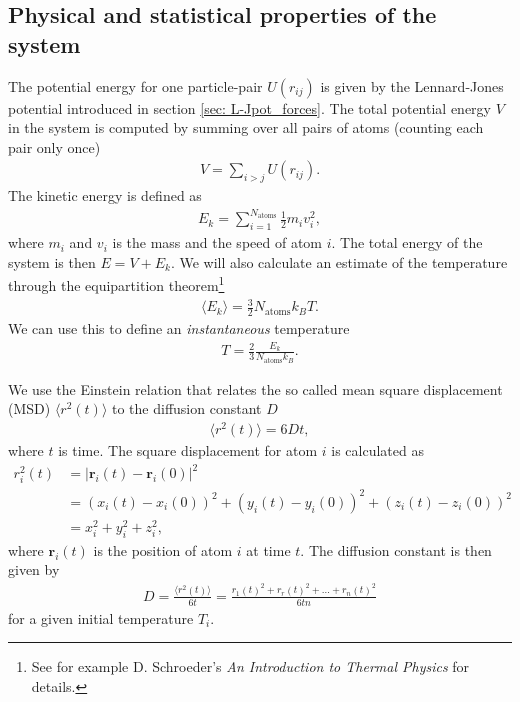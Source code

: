 \documentclass[11pt,a4wide]{article}
\renewcommand{\vec}{\mathbf}
\begin{document}
\subsection{Physical and statistical properties of the system} \label{sec: statistics_theory}
The potential energy for one particle-pair $U(r_{ij})$ is given by the Lennard-Jones potential introduced in section \ref{sec: L-Jpot_forces}. The total potential energy $V$ in the system is computed by summing over all pairs of atoms (counting each pair only once) 
\begin{align}
	V = \sum_{i>j} U(r_{ij}).
\end{align}
The kinetic energy is defined as
\begin{align}
	E_k = \sum_{i=1}^{N_\text{atoms}} \frac{1}{2} m_i v_i^2,
\end{align}
where $m_i$ and $v_i$ is the mass and the speed of atom $i$. The total energy of the system is then $E = V + E_k$. We will also calculate an estimate of the temperature through the equipartition theorem\footnote{See for example D. Schroeder's \textit{An Introduction to Thermal Physics} for details.}
\begin{align}
	\langle E_k \rangle = \frac{3}{2}N_\text{atoms} k_B T.
\end{align}
We can use this to define an \textit{instantaneous} temperature
\begin{align}
	\label{eq:temperature}
	T = \frac{2}{3}\frac{E_k}{N_\text{atoms} k_B}.
\end{align}

We use the Einstein relation that relates the so called mean square displacement (MSD) $\langle r^2(t) \rangle$ to the diffusion constant $D$
\begin{align}
	\langle r^2(t) \rangle = 6Dt,
\end{align}
where $t$ is time. The square displacement for atom $i$ is calculated as
\begin{align}
	r_i^2(t) &= |\vec r_i(t) - \vec r_i(0)|^2 \\
	&= (x_i(t)-x_i(0))^2 + (y_i(t)-y_i(0))^2 + (z_i(t)-z_i(0))^2 \\
	&= x_i^2 + y_i^2 + z_i^2,
\end{align}
where $\vec r_i(t)$ is the position of atom $i$ at time $t$. The diffusion constant is then given by
\begin{align*}
D = \frac{\langle r^2(t) \rangle}{6t} = \frac{r_1(t)^2 + r_r(t)^2 + \dots + r_n(t)^2}{6tn}
\end{align*}
for a given initial temperature $T_i$.
\end{document}
